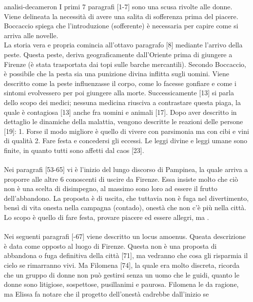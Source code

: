 \documentclass[preview]{standalone}
\begin{document}
\begin{snippet}{analisi-decameron}
    I primi 7 paragrafi [1-7] sono una scusa rivolte alle donne. Viene delineata la necessità di 
    avere una salita di sofferenza prima del piacere.
    Boccaccio spiega che l'introduzione (sofferente) è necessaria per capire come si arriva alle novelle. \\
    La storia vera e propria comincia all'ottavo paragrafo [8] mediante l'arrivo della peste.
    Questa peste, deriva geograficamente dall'Oriente prima di giungere a Firenze
    (è stata trasportata dai topi sulle barche mercantili).
    Secondo Boccaccio, è possibile che la pesta sia una punizione divina inflitta sugli uomini.
    Viene descritto come la peste influenzasse il corpo, come lo facesse gonfiare e come i sintomi evolvessero per poi giungere alla morte.
    Successicamente [13] si parla dello scopo dei medici; nessuna medicina riusciva a contrastare questa piaga, la quale è contagiosa [13]
    anche fra uomini e animali [17].
    Dopo aver descritto in dettaglio le dinamiche della malattia, vengono descritte
    le reazioni delle persone [19]: 1. Forse il modo migliore è quello di vivere con parsimonia ma con cibi e vini di qualità
    2. Fare festa e concedersi gli eccessi.
    Le leggi divine e leggi umane sono finite, in quanto tutti sono affetti dal caos [23].
    \\\\
    Nei paragrafi [53-65] vi è l'inizio del lungo discorso di Pampinea, la quale arriva a proporre alle altre 6 conoscenti
    di uscire da Firenze. Essa insiste molto che ciò non è una scelta di disimpegno,
    al massimo sono loro ad essere il frutto dell'abbandono.
    La proposta è di uscita, che tuttavia non è fuga nel divertimento, bensì di vita onesta nella campagna (contado),
    onestà che non c'è più nella città. Lo scopo è quello di fare festa, provare piacere ed essere allegri,
    ma .
    \\\\
    Nei seguenti paragrafi [-67] viene descritto un locus amoenus.
    Queata descrizione è data come opposto al luogo di Firenze.
    Questa non è una proposta di abbandona o fuga definitiva della città [71],
    ma vedranno che cosa gli risparmia il cielo se rimarranno vivi.
    Ma Filomena [74], la quale era molto discreta, ricorda che un gruppo di donne non può gestirsi
    senza un uomo che le guidi, quanto le donne sono litigiose, sospettose, pusillanimi e paurosa.
    Filomena le da ragione, ma Elissa fa notare che il progetto dell'onestà cadrebbe dall'inizio se

\end{snippet}
\end{document}
